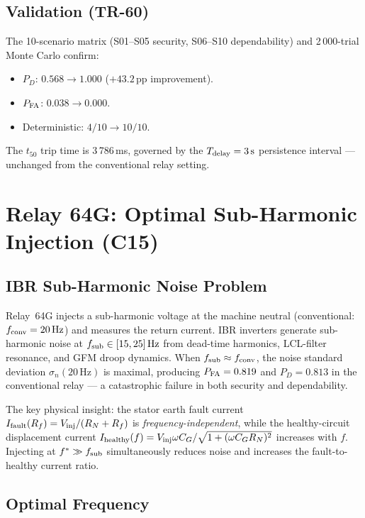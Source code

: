 \documentclass[journal,twoside]{IEEEtran}
\begin{document}
\subsection{Validation (TR-60)}

The 10-scenario matrix (S01--S05 security, S06--S10 dependability) and
2\,000-trial Monte Carlo confirm:
\begin{itemize}
  \item $P_D$: $0.568 \to 1.000$ ($+43.2$\,pp improvement).
  \item $P_{\rm FA}$: $0.038 \to 0.000$.
  \item Deterministic: $4/10 \to 10/10$.
\end{itemize}
The $t_{50}$ trip time is 3\,786\,ms, governed by the $T_{\rm delay} = 3\,\text{s}$
persistence interval --- unchanged from the conventional relay setting.

\section{Relay 64G: Optimal Sub-Harmonic Injection (C15)}
\label{sec:relay64g}

\subsection{IBR Sub-Harmonic Noise Problem}

Relay~64G injects a sub-harmonic voltage at the machine neutral (conventional:
$f_{\rm conv} = 20\,\text{Hz}$) and measures the return current.
IBR inverters generate sub-harmonic noise at $f_{\rm sub} \in [15, 25]\,\text{Hz}$
from dead-time harmonics, LCL-filter resonance, and GFM droop dynamics.
When $f_{\rm sub} \approx f_{\rm conv}$, the noise standard deviation
$\sigma_n(20\,\text{Hz})$ is maximal, producing $P_{\rm FA} = 0.819$ and
$P_D = 0.813$ in the conventional relay --- a catastrophic failure in both
security and dependability.

The key physical insight: the stator earth fault current
$I_{\rm fault}(R_f) = V_{\rm inj}/(R_N + R_f)$ is
\emph{frequency-independent}, while the healthy-circuit displacement current
$I_{\rm healthy}(f) = V_{\rm inj}\omega C_G / \sqrt{1 + (\omega C_G R_N)^2}$
increases with $f$.
Injecting at $f^* \gg f_{\rm sub}$ simultaneously reduces noise and increases
the fault-to-healthy current ratio.

\subsection{Optimal Frequency}
\end{document}
